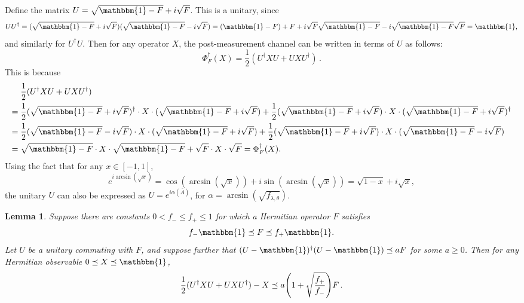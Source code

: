 \documentclass[10pt]{article}
\DeclarePairedDelimiter\parens{\lparen}{\rparen}
\newcommand{\luders}{\Phi}
\newcommand{\Id}{\mathbbm{1}}
\newtheorem{lemma}[theorem]{Lemma}
\newcommand{\lift}[1]{\overline{#1}}
\begin{document}
Define the matrix $U = \sqrt{\Id - F} + i\sqrt{F}$.
This is a unitary, since 
\begin{equation*}
    U U^{\dagger}
    = (\sqrt{\Id - F} + i\sqrt{F}) (\sqrt{\Id - F} - i\sqrt{F})
    = (\Id- F) + F + i \sqrt{F} \sqrt{\Id - F} - i \sqrt{\Id - F}\sqrt{F}
    = \Id,
\end{equation*}
and similarly for $U^{\dagger} U$.
Then for any operator $X$, the post-measurement channel can be written in terms of $U$ as follows:
\begin{equation}
    \label{eq:logm-channel-time-evolution}
    \luders^\dagger_F(X) = \frac{1}{2}(U^\dagger X U + U X U^\dagger)\,.
\end{equation}
This is because
\begin{align*}
    &\frac{1}{2}(U^\dagger X U + U X U^\dagger)\\
    ={}& \frac{1}{2}(\sqrt{\Id - F} + i\sqrt{F})^\dagger\cdot  X \cdot (\sqrt{\Id - F} + i\sqrt{F}) + \frac{1}{2} (\sqrt{\Id - F} + i\sqrt{F})\cdot X \cdot (\sqrt{\Id - F} + i\sqrt{F})^\dagger\\
    ={}& \frac{1}{2}(\sqrt{\Id - F} - i\sqrt{F})\cdot  X \cdot (\sqrt{\Id - F} + i\sqrt{F}) + \frac{1}{2} (\sqrt{\Id - F} + i\sqrt{F})\cdot X \cdot (\sqrt{\Id - F} - i\sqrt{F})\\
    ={}& \sqrt{\Id - F} \cdot X \cdot \sqrt{\Id - F} + \sqrt{F} \cdot X \cdot \sqrt{F}= \luders^\dagger_F(X).
\end{align*}
Using the fact that for any $x \in [-1, 1]$,
\begin{equation*}
    e^{i \arcsin(\sqrt{x})}
    = \cos(\arcsin(\sqrt{x})) + i \sin(\arcsin(\sqrt{x}))
    = \sqrt{1 - x} + i \sqrt{x},
\end{equation*}
the unitary $U$ can also be expressed as $U = e^{i\alpha(\lift{A})}$, for $\alpha = \arcsin(\sqrt{f_{\lambda,\theta}})$.

\begin{lemma}\label{lem:linalg}
    Suppose there are constants $0 < f_- \le f_+ \le 1$ for which a Hermitian operator $F$ satisfies
    \begin{equation}
        f_- \Id \preceq F \preceq f_+\Id.
    \end{equation}
    Let $U$ be a unitary commuting with $F$, and suppose further that $(U-\Id)^{\dagger}(U-\Id) \preceq aF$ for some $a\ge 0$. Then for any Hermitian observable $0 \preceq X \preceq \Id$,
    \begin{equation}
        \frac{1}{2}(U^\dagger X U + UXU^\dagger) - X \preceq a\parens*{1 + \sqrt{\frac{f_+}{f_-}}} F\,.
    \end{equation}
\end{lemma}
\end{document}
